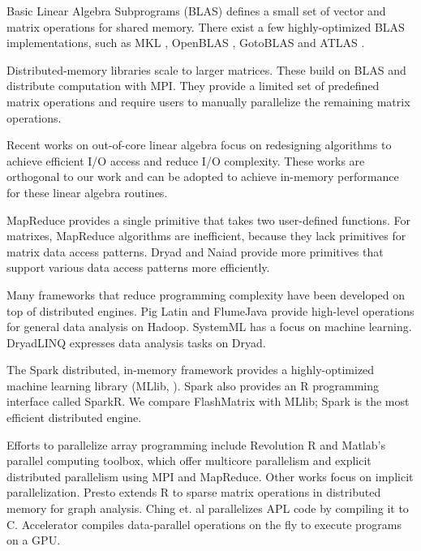 Basic Linear Algebra Subprograms (BLAS) defines a small set of vector and
matrix operations for shared memory. There exist a few
highly-optimized BLAS implementations, such as MKL \cite{mkl}, OpenBLAS
\cite{openblas}, GotoBLAS \cite{Goto} and ATLAS \cite{atlas}. 

Distributed-memory libraries \cite{trilinos, petsc, elemental}
scale to larger matrices. 
These build on BLAS and distribute computation with MPI.
They provide a limited set of predefined matrix operations and
require users to manually parallelize the remaining matrix operations.

Recent works on out-of-core linear algebra \cite{Toledo99, Quintana-Orti12}
focus on redesigning algorithms to achieve efficient I/O access and reduce I/O
complexity. These works are orthogonal to our work and can be adopted to
achieve in-memory performance for these linear algebra routines.

MapReduce \cite{mapreduce} 
provides a single primitive that takes two user-defined functions. 
For matrixes, MapReduce algorithms are inefficient, because they lack
primitives for matrix data access patterns.
Dryad \cite{dryad} and Naiad \cite{naiad} provide more primitives 
that support various data access patterns more efficiently.

Many frameworks that reduce programming complexity have been developed on top of distributed engines.
Pig Latin \cite{pig} and FlumeJava \cite{flumejava}
provide high-level operations for general data analysis on Hadoop.
SystemML \cite{systemml} has a focus on machine learning. 
DryadLINQ \cite{dryadlinq} expresses data analysis tasks on Dryad. 

The Spark \cite{spark} distributed, in-memory framework
provides a highly-optimized machine learning library (MLlib, \cite{mllib}).
Spark also provides an R programming interface called SparkR.  
We compare FlashMatrix with MLlib; Spark is the most efficient distributed engine.

Efforts to parallelize array programming include
Revolution R \cite{rre} and Matlab's parallel computing toolbox, which
offer multicore parallelism and explicit distributed parallelism using MPI and MapReduce. 
Other works focus on implicit parallelization.
Presto \cite{presto} extends R to sparse matrix operations in distributed memory for graph
analysis. Ching et. al \cite{Ching12} parallelizes APL code by
compiling it to C. Accelerator \cite{accelerator} compiles
data-parallel operations on the fly to execute programs on a GPU.
